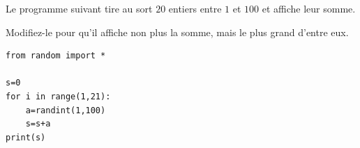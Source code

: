 \begin{exo}{}
	Le programme suivant tire au sort $20$ entiers entre $1$ et $100$ et affiche leur somme.

	Modifiez-le pour qu'il affiche non plus la somme, mais le plus grand d'entre eux.

	\begin{lstlisting}
from random import *

s=0
for i in range(1,21):
    a=randint(1,100)
    s=s+a
print(s)
\end{lstlisting}
\end{exo}

